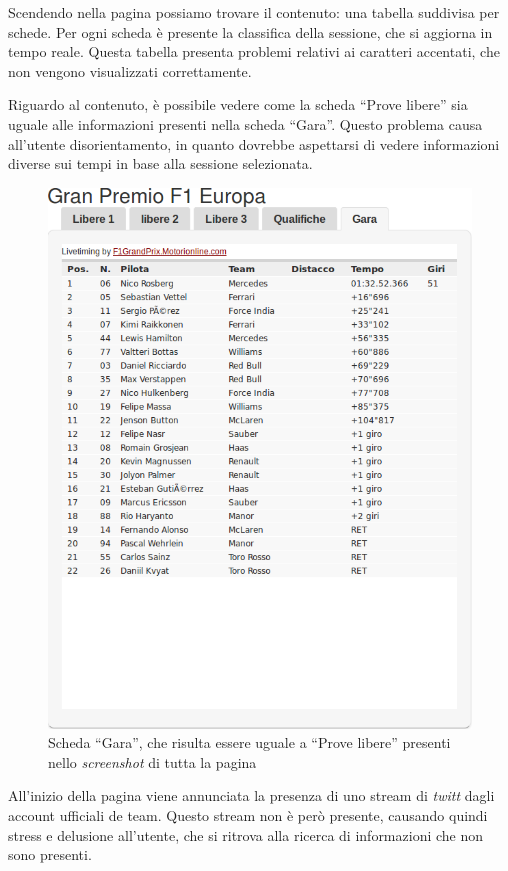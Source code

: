 Scendendo nella pagina possiamo trovare il contenuto: una tabella suddivisa per
schede. Per ogni scheda è presente la classifica della sessione, che si aggiorna
in tempo reale. Questa tabella presenta problemi relativi ai caratteri
accentati, che non vengono visualizzati correttamente.

Riguardo al contenuto, è possibile vedere come la scheda ``Prove libere''
sia uguale alle informazioni presenti nella scheda ``Gara''. Questo problema
causa all'utente disorientamento, in quanto dovrebbe aspettarsi di vedere
informazioni diverse sui tempi in base alla sessione selezionata.

\begin{figure}[H]

  \centering
  \includegraphics[scale=0.5]{res/img/dettagli/tableScore}
  \caption{Scheda ``Gara'', che risulta essere uguale a ``Prove libere''
    presenti nello \textit{screenshot} di tutta la pagina} 
\end{figure}

All'inizio della pagina viene annunciata la presenza di uno stream di
\textit{twitt} dagli account ufficiali de team. Questo stream non è però
presente, causando quindi stress e delusione all'utente, che si ritrova alla
ricerca di informazioni che non sono presenti.


